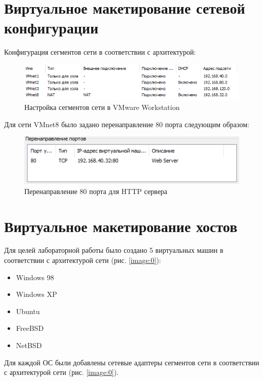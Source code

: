 \documentclass[14pt,a4paper,report]{report}
\begin{document}
\section{Виртуальное макетирование сетевой конфигурации}

Конфигурация сегментов сети в соответствии с архитектурой:

\begin{figure}[h!]
	\centering
	\includegraphics[scale = 1.1]{images/1.png}
	\caption{Настройка сегментов сети в VMware Workstation}
	\label{image:1}
\end{figure}

Для сети VMnet8 было задано перенаправление 80 порта следующим образом:

\begin{figure}[h!]
	\centering
	\includegraphics[scale = 1.1]{images/6_1.png}
	\caption{Перенаправление 80 порта для HTTP сервера}
	\label{image:3}
\end{figure}

\section{Виртуальное макетирование хостов}

Для целей лабораторной работы было создано 5 виртуальных машин в соответствии с архитектурой сети (рис. \ref{image:0}):

\begin{itemize}
	\item Windows 98
	\item Windows XP
	\item Ubuntu
	\item FreeBSD
	\item NetBSD
\end{itemize}

Для каждой ОС были добавлены сетевые адаптеры сегментов сети в соответствии с архитектурой сети (рис. \ref{image:0}).
\end{document}
